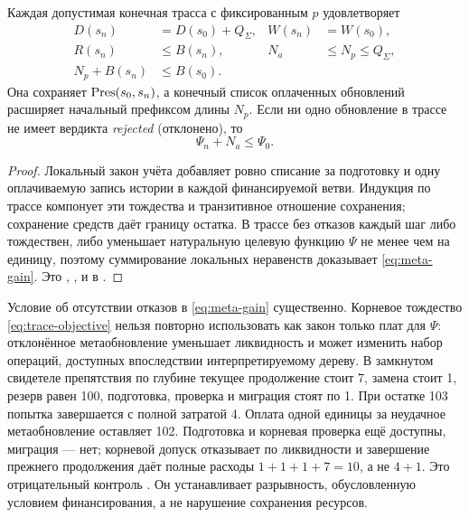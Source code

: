 \begin{theorem}\label{thm:meta-closure}
Каждая допустимая конечная трасса с фиксированным $p$ удовлетворяет
\begin{align}
 D(s_n)&=D(s_0)+Q_\Sigma,& W(s_n)&=W(s_0),\\
 R(s_n)&\le B(s_n),& N_a&\le N_p\le Q_\Sigma,\\
 N_p+B(s_n)&\le B(s_0).
\end{align}
Она сохраняет $\operatorname{Pres}(s_0,s_n)$, а конечный список оплаченных обновлений расширяет начальный префиксом длины $N_p$. Если ни одно обновление в трассе не имеет вердикта \emph{rejected} (отклонено), то
\begin{equation}\label{eq:meta-gain}
 \Psi_n+N_a\le\Psi_0.
\end{equation}
\end{theorem}
\begin{proof}
Локальный закон учёта добавляет ровно списание за подготовку и одну оплачиваемую запись истории в каждой финансируемой ветви. Индукция по трассе компонует эти тождества и транзитивное отношение сохранения; сохранение средств даёт границу остатка. В трассе без отказов каждый шаг либо тождествен, либо уменьшает натуральную целевую функцию $\Psi$ не менее чем на единицу, поэтому суммирование локальных неравенств доказывает \eqref{eq:meta-gain}. Это , ,  и  в .
\end{proof}

Условие об отсутствии отказов в \eqref{eq:meta-gain} существенно. Корневое тождество \eqref{eq:trace-objective} нельзя повторно использовать как закон только плат для $\Psi$: отклонённое метаобновление уменьшает ликвидность и может изменить набор операций, доступных впоследствии интерпретируемому дереву. В замкнутом свидетеле препятствия по глубине текущее продолжение стоит 7, замена стоит 1, резерв равен 100, подготовка, проверка и миграция стоят по 1. При остатке 103 попытка завершается с полной затратой 4. Оплата одной единицы за неудачное метаобновление оставляет 102. Подготовка и корневая проверка ещё доступны, миграция --- нет; корневой допуск отказывает по ликвидности и завершение прежнего продолжения даёт полные расходы $1+1+1+7=10$, а не $4+1$. Это отрицательный контроль . Он устанавливает разрывность, обусловленную условием финансирования, а не нарушение сохранения ресурсов.

